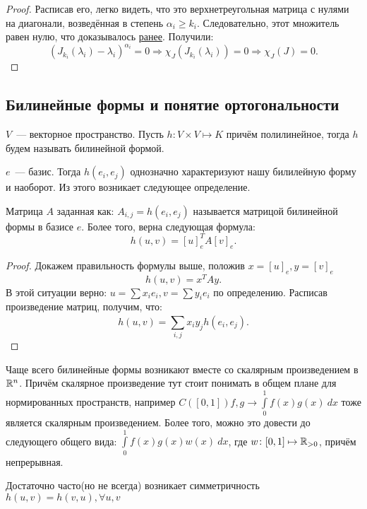 \begin{proof}
    Расписав его, легко
    видеть, что это верхнетреугольная матрица с нулями на диагонали,
    возведённая в степень $\alpha_i \ge k_i$. Следовательно, этот множитель
    равен нулю, что доказывалось \hyperref[fix:nilpotent]{ранее}.
    Получили: 
    \[
        (J_{k_i}(\lambda_i) - \lambda_i)^{\alpha_i} = 0 \Rightarrow
        \chi_J(J_{k_i}(\lambda_i)) = 0 \Rightarrow
        \chi_J(J) = 0
    .\]
\end{proof}

\subsection{Билинейные формы и понятие ортогональности}
\begin{definition}
    $V$~--- векторное пространство.
    Пусть $h\colon V \times V \mapsto K$ причём полилинейное, тогда $h$ будем называть
    билинейной формой.
\end{definition}
\begin{remark}
    $e$~--- базис.
    Тогда $h(e_i, e_j)$ однозначно характеризуют нашу билилейную форму и наоборот.
    Из этого возникает следующее определение.
\end{remark}
\begin{definition}
    Матрица $A$ заданная как: $A_{i,j} = h(e_i, e_j)$ называется матрицой билинейной формы в базисе $e$.
    Более того, верна следующая формула:
    \[
        h(u, v) = [u]^T_eA[v]_e
    .\] 
\end{definition}
\begin{proof}
Докажем правильность формулы выше, положив $x = [u]_e, y = [v]_e$
 \[
    h(u, v) = x^T A y
.\] 
В этой ситуации верно: $u = \sum x_ie_i, v = \sum y_i e_i$ по определению.
Расписав произведение матриц, получим, что:
\[
    h(u, v) = \sum\limits_{i, j}^{}{x_i y_j h(e_i, e_j)}
.\] 
\end{proof}
\begin{motivation}
    Чаще всего билинейные формы возникают вместе со скалярным произведением 
    в $\mathbb{R}^n$. Причём скалярное произведение тут стоит понимать в общем плане для
    нормированных пространств, например $C\left([0, 1]\right) f, g \rightarrow \int\limits_{0}^{1}{f(x)g(x)\ dx}$
    тоже является скалярным произведением. Более того, можно это довести до следующего
    общего вида:
    $\int\limits_{0}^{1}{f(x)g(x) w(x)\ dx}$, где $w\colon [0, 1]\mapsto \mathbb{R}_{> 0}$,
    причём непрерывная.
\end{motivation}
\begin{definition}
    \item Достаточно часто(но не всегда) возникает симметричность
        $h(u,v) = h(v,u), \forall u,v$ 
\end{definition}
